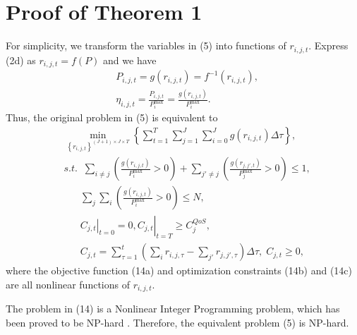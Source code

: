 \documentclass{ieeeaccess}
\begin{document}
\section{Proof of Theorem 1}
For simplicity, we transform the variables in (5) into functions of $r_{i,j,t}$.
Express (2d) as ${r_{i,j,t}} = f\left( P \right)$ and we have 
\begin{subequations}
  \begin{align}
  & {P_{i,j,t}} = g\left( {{r_{i,j,t}}} \right) = {f^{ - 1}}\left( {{r_{i,j,t}}} \right), \\
  & {\eta _{i,j,t}} = \frac{{{P_{i,j,t}}}}{{P_i^{\max }}} = \frac{{g\left( {{r_{i,j,t}}} \right)}}{{P_i^{\max }}}.
  \end{align}
\end{subequations}
Thus, the original problem in (5) is equivalent to 
\begin{subequations}
  \begin{align}
  & \mathop {\min }\limits_{{{\left\{ {{r_{i,j,t}}} \right\}}^{\left( {J + 1} \right) \times J \times T}}} \left\{ {\sum\limits_{t = 1}^T {\sum\limits_{j = 1}^J {\sum\limits_{i = 0}^J {g\left( {{r_{i,j,t}}} \right) \Delta \tau } } } } \right\}, \\
  & {s.t.} \;\; \sum\limits_{i \ne j} {\left( {\frac{{g\left( {{r_{i,j,t}}} \right)}}{{P_i^{\max }}} > 0} \right)}  + \sum\limits_{j' \ne j} {\left( {\frac{{g\left( {{r_{j,j',t}}} \right)}}{{P_j^{\max }}} > 0} \right) \le {1}}, \\
  & \;\;\;\;\;\; \sum\limits_j {\sum\limits_i {\left( {\frac{{g\left( {{r_{i,j,t}}} \right)}}{{P_i^{\max }}} > 0} \right)} }  \le N, \\
  & \;\;\;\;\;\; {\left. {{{\left. {{C_{j,t}}} \right|}_{t = 0}} = 0, {C_{j,t}}} \right|_{t = T}} \ge C_j^{QoS} ,\\
  & \;\;\;\;\;\; {C_{j,t}} = \sum\limits_{\tau  = 1}^t {\left( {\sum\limits_i {{r_{i,j,\tau }}}  - \sum\limits_{j'} {{r_{j,j',\tau }}} } \right)\Delta \tau } ,\; {C_{j,t}} \ge 0,
  \end{align}
\end{subequations}
where the objective function (14a) and optimization constraints (14b) and (14c) are all nonlinear functions of $r_{i,j,t}$.

The problem in (14) is a Nonlinear Integer Programming problem, which has been proved to be NP-hard \cite{p406}. 
Therefore, the equivalent problem (5) is NP-hard.
\end{document}
